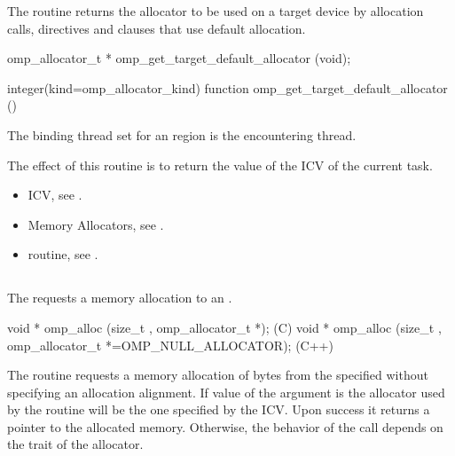 \summary
The  routine returns the allocator to be used on a target device by allocation calls, directives and clauses that use default allocation.

\format
\ccppspecificstart
\begin{boxedcode}
omp_allocator_t * omp_get_target_default_allocator (void);
\end{boxedcode}
\ccppspecificend
\fortranspecificstart
\begin{boxedcode}
integer(kind=omp_allocator_kind) 
function omp_get_target_default_allocator ()
\end{boxedcode}
\fortranspecificend

\binding

The binding thread set for an  region is the encountering thread.

\effect

The effect of this routine is to return the value of the  ICV of the current task.

\crossreferences
\begin{itemize}
\item {} ICV, see .
\item Memory Allocators, see .
\item {} routine, see .
\end{itemize}

\ccppspecificstart


\subsection{}
\label{subsec:omp_alloc}

\summary
The  requests a memory allocation to an .

\format
\begin{boxedcode}
void * omp_alloc (size_t , omp_allocator_t *);  (C)
void * omp_alloc (size_t , 
           omp_allocator_t *=OMP_NULL_ALLOCATOR); (C++)
\end{boxedcode}

\effect

The  routine requests a memory allocation of  bytes from the specified  without specifying an allocation alignment. If value of the  argument is 
 the allocator used by the routine will be the one specified by the  ICV.
Upon success it returns a pointer to the allocated memory. Otherwise, the behavior of the call depends on the  trait of the allocator.


